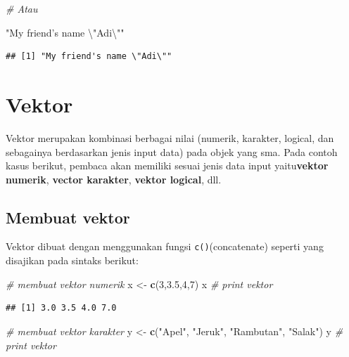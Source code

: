 \documentclass[]{book}
\newenvironment{Shaded}{\begin{snugshade}}{\end{snugshade}}
\newcommand{\KeywordTok}[1]{\textcolor[rgb]{0.13,0.29,0.53}{\textbf{#1}}}
\newcommand{\DecValTok}[1]{\textcolor[rgb]{0.00,0.00,0.81}{#1}}
\newcommand{\FloatTok}[1]{\textcolor[rgb]{0.00,0.00,0.81}{#1}}
\newcommand{\CharTok}[1]{\textcolor[rgb]{0.31,0.60,0.02}{#1}}
\newcommand{\StringTok}[1]{\textcolor[rgb]{0.31,0.60,0.02}{#1}}
\newcommand{\CommentTok}[1]{\textcolor[rgb]{0.56,0.35,0.01}{\textit{#1}}}
\newcommand{\NormalTok}[1]{#1}
\begin{document}
\begin{Shaded}
\begin{Highlighting}[]
\CommentTok{# Atau}

\StringTok{"My friend's name }\CharTok{\textbackslash{}"}\StringTok{Adi}\CharTok{\textbackslash{}"}\StringTok{"}
\end{Highlighting}
\end{Shaded}

\begin{verbatim}
## [1] "My friend's name \"Adi\""
\end{verbatim}

\section{Vektor}\label{vektor}

Vektor merupakan kombinasi berbagai nilai (numerik, karakter, logical,
dan sebagainya berdasarkan jenis input data) pada objek yang sma. Pada
contoh kasus berikut, pembaca akan memiliki sesuai jenis data input
yaitu\textbf{vektor numerik}, \textbf{vector karakter}, \textbf{vektor
logical}, dll.

\subsection{Membuat vektor}\label{membuat-vektor}

Vektor dibuat dengan menggunakan fungsi \texttt{c()}(concatenate)
seperti yang disajikan pada sintaks berikut:

\begin{Shaded}
\begin{Highlighting}[]
\CommentTok{# membuat vektor numerik}
\NormalTok{x <-}\StringTok{ }\KeywordTok{c}\NormalTok{(}\DecValTok{3}\NormalTok{,}\FloatTok{3.5}\NormalTok{,}\DecValTok{4}\NormalTok{,}\DecValTok{7}\NormalTok{)}
\NormalTok{x }\CommentTok{# print vektor}
\end{Highlighting}
\end{Shaded}

\begin{verbatim}
## [1] 3.0 3.5 4.0 7.0
\end{verbatim}

\begin{Shaded}
\begin{Highlighting}[]
\CommentTok{# membuat vektor karakter}
\NormalTok{y <-}\StringTok{ }\KeywordTok{c}\NormalTok{(}\StringTok{"Apel"}\NormalTok{, }\StringTok{"Jeruk"}\NormalTok{, }\StringTok{"Rambutan"}\NormalTok{, }\StringTok{"Salak"}\NormalTok{)}
\NormalTok{y }\CommentTok{# print vektor}
\end{Highlighting}
\end{Shaded}
\end{document}
